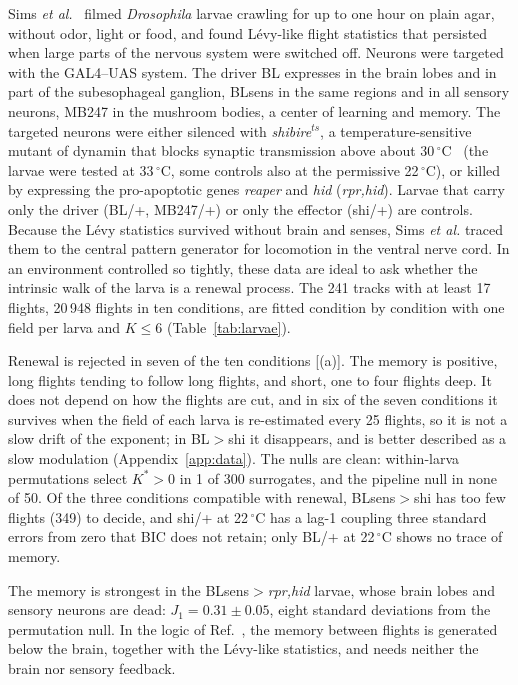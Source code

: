 Sims \emph{et al.}~\cite{Sims2019} filmed \emph{Drosophila} larvae crawling for up to one hour on plain agar, without odor, light or food, and found L\'evy-like flight statistics that persisted when large parts of the nervous system were switched off. Neurons were targeted with the GAL4--UAS system. The driver BL expresses in the brain lobes and in part of the subesophageal ganglion, BLsens in the same regions and in all sensory neurons, MB247 in the mushroom bodies, a center of learning and memory. The targeted neurons were either silenced with \emph{shibire}$^{ts}$, a temperature-sensitive mutant of dynamin that blocks synaptic transmission above about 30\,$^\circ$C~\cite{Kitamoto2001} (the larvae were tested at 33\,$^\circ$C, some controls also at the permissive 22\,$^\circ$C), or killed by expressing the pro-apoptotic genes \emph{reaper} and \emph{hid} (\emph{rpr,hid}). Larvae that carry only the driver (BL/+, MB247/+) or only the effector (shi/+) are controls. Because the L\'evy statistics survived without brain and senses, Sims \emph{et al.} traced them to the central pattern generator for locomotion in the ventral nerve cord. In an environment controlled so tightly, these data are ideal to ask whether the intrinsic walk of the larva is a renewal process. The 241 tracks with at least 17 flights, 20\,948 flights in ten conditions, are fitted condition by condition with one field per larva and $K\le6$ (Table~\ref{tab:larvae}).

Renewal is rejected in seven of the ten conditions [(a)]. The memory is positive, long flights tending to follow long flights, and short, one to four flights deep. It does not depend on how the flights are cut, and in six of the seven conditions it survives when the field of each larva is re-estimated every 25 flights, so it is not a slow drift of the exponent; in BL$>$shi it disappears, and is better described as a slow modulation (Appendix~\ref{app:data}). The nulls are clean: within-larva permutations select $K^*>0$ in 1 of 300 surrogates, and the pipeline null in none of 50. Of the three conditions compatible with renewal, BLsens$>$shi has too few flights (349) to decide, and shi/+ at 22\,$^\circ$C has a lag-1 coupling three standard errors from zero that BIC does not retain; only BL/+ at 22\,$^\circ$C shows no trace of memory.

The memory is strongest in the BLsens$>$\emph{rpr,hid} larvae, whose brain lobes and sensory neurons are dead: $J_1=0.31\pm0.05$, eight standard deviations from the permutation null. In the logic of Ref.~\cite{Sims2019}, the memory between flights is generated below the brain, together with the L\'evy-like statistics, and needs neither the brain nor sensory feedback.

